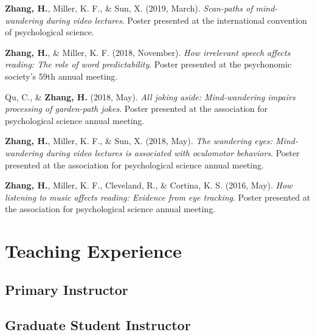 \documentclass[11pt,a4paper,]{awesome-cv}
\begin{document}
\leavevmode{}%
\textbf{Zhang, H.}, Miller, K. F., \& Sun, X. (2019, March).
\emph{Scan-paths of mind-wandering during video lectures}. Poster
presented at the international convention of psychological science.

\leavevmode{}%
\textbf{Zhang, H.}, \& Miller, K. F. (2018, November). \emph{How
irrelevant speech affects reading: The role of word predictability}.
Poster presented at the psychonomic society's 59th annual meeting.

\leavevmode{}%
Qu, C., \& \textbf{Zhang, H.} (2018, May). \emph{All joking aside:
Mind-wandering impairs processing of garden-path jokes}. Poster
presented at the association for psychological science annual meeting.

\leavevmode{}%
\textbf{Zhang, H.}, Miller, K. F., \& Sun, X. (2018, May). \emph{The
wandering eyes: Mind-wandering during video lectures is associated with
oculomotor behaviors}. Poster presented at the association for
psychological science annual meeting.

\leavevmode{}%
\textbf{Zhang, H.}, Miller, K. F., Cleveland, R., \& Cortina, K. S.
(2016, May). \emph{How listening to music affects reading: Evidence from
eye tracking}. Poster presented at the association for psychological
science annual meeting.

\hypertarget{teaching-experience}{%
\section{Teaching Experience}\label{teaching-experience}}

\hypertarget{primary-instructor}{%
\subsection{Primary Instructor}\label{primary-instructor}}

\begin{cventries}
    \vspace{-4.0mm}
\end{cventries}

\hypertarget{graduate-student-instructor}{%
\subsection{Graduate Student
Instructor}\label{graduate-student-instructor}}
\end{document}
